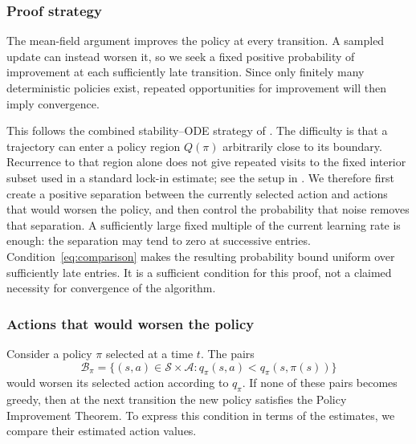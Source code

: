\documentclass[twoside,11pt]{article}
\DeclareRobustCommand{\reviewbarstart}{%
  \ifhmode %
    \vadjust{\vbox to 0pt{%
      \vskip-\ht\strutbox %
      \vskip-\dp\strutbox %
      \cbstart[\changebarwidth] %
      \vss %
    }}%
  \else %
    \cbstart[\changebarwidth]%
  \fi %
} %
\providecommand{\DIFadd}[1]{#1} %
\providecommand{\DIFaddbegin}{\reviewbarstart} %
\providecommand{\DIFaddend}{\protect\cbend} %
\def\DIFadd#1{#1}%
\def\DIFaddbegin{}%
\def\DIFaddend{}%
\begin{document}
 \DIFaddbegin \subsubsection{\DIFadd{Proof strategy}}
\label{sec: limitations of existing methods}
\DIFadd{The }\DIFaddend mean-field  \DIFaddbegin \DIFadd{argument improves the policy at every transition. A sampled update can instead worsen it, so we seek a fixed positive probability of improvement at each sufficiently late transition. Since only finitely many deterministic policies exist, repeated opportunities for improvement will then imply convergence.
}\DIFaddend 

 \DIFaddbegin \DIFadd{This follows the combined stability--ODE strategy of \citet[Section~5.4]{Kushner2003StochasticApplications}. The difficulty is that a trajectory can enter a policy region $Q(\pi)$ arbitrarily close to its boundary. Recurrence to that region alone does not give repeated visits to the fixed interior subset used in a standard }\DIFaddend lock-in  \DIFaddbegin \DIFadd{estimate; see the setup in \citet[Section~3]{Borkar2002OnApproximation}.
We therefore first create a positive separation between the currently selected action and actions that would worsen the policy, and then control the probability that noise removes that separation. A sufficiently large fixed multiple of the current learning rate is enough: the separation may tend to zero at successive entries. Condition~\eqref{eq:comparison} makes the resulting probability bound uniform over sufficiently late entries. It is a sufficient condition for this proof, not a claimed necessity for convergence of the algorithm.
}

\subsubsection{\DIFadd{Actions that would worsen the policy}}
\DIFadd{Consider a policy $\pi$ selected at a time $t$. The pairs
}\[
\DIFadd{\mathcal B_\pi=\big\{(s,a)\in\mathcal S\times\mathcal A:
q_\pi(s,a)<q_\pi(s,\pi(s))\big\}
}\]
\DIFadd{would worsen its selected action according to $q_\pi$. If none of these pairs becomes greedy, then at the next transition the new policy satisfies the Policy Improvement Theorem. To express this condition in terms of the estimates, we compare their estimated }\DIFaddend action values.
\end{document}
